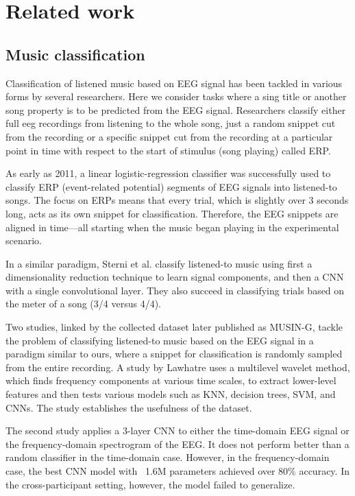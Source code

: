 
\chapter{Related work}

\section{Music classification}

Classification of listened music based on EEG signal has been tackled in various forms by several researchers.
Here we consider tasks where a sing title or another song property is to be predicted from the EEG signal.
Researchers classify either full eeg recordings from listening to the whole song, just a random snippet cut from the recording or a 
specific snippet cut from the recording at a particular point in time with respect to the start of stimulus (song playing) called ERP.

As early as 2011, a linear logistic-regression classifier was successfully used to classify ERP (event-related potential) segments of EEG signals into listened-to songs\cite{rebecca}.
The focus on ERPs means that every trial, which is slightly over 3 seconds long, acts as its own snippet for classification.
Therefore, the EEG snippets are aligned in time---all starting when the music began playing in the experimental scenario.

In a similar paradigm, Sterni et al.\cite{sterni} classify listened-to music using first a dimensionality reduction technique to learn signal components, and then a CNN with a single convolutional layer.
They also succeed in classifying trials based on the meter of a song (3/4 versus 4/4).

Two studies, linked by the collected dataset later published as MUSIN-G, tackle the problem of classifying listened-to music based on the EEG signal in a paradigm similar to ours, 
where a snippet for classification is randomly sampled from the entire recording.
A study by Lawhatre uses a multilevel wavelet method, which finds frequency components at various time scales, to extract lower-level features and then tests various models such as KNN, decision trees, SVM, and CNNs\cite{lawhatre}.
The study establishes the usefulness of the dataset.

The second study applies a 3-layer CNN to either the time-domain EEG signal or the frequency-domain spectrogram of the EEG\cite{guess}.
It does not perform better than a random classifier in the time-domain case.
However, in the frequency-domain case, the best CNN model with ~1.6M parameters achieved over 80\% accuracy.
In the cross-participant setting, however, the model failed to generalize.

